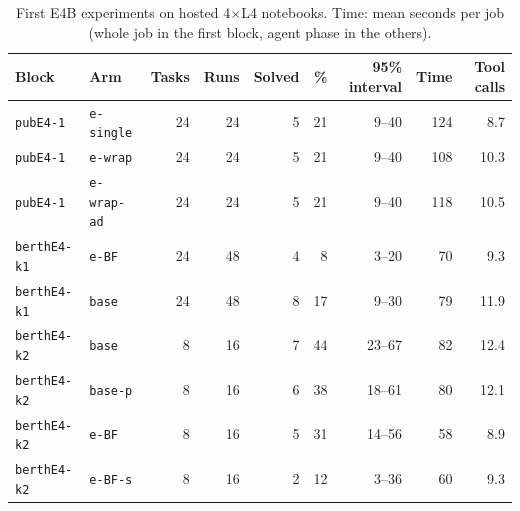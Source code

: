 \begin{table}[t]
\centering
\footnotesize
\caption{First E4B experiments on hosted 4$\times$L4 notebooks. Time: mean seconds per job (whole job in the first block, agent phase in the others).}
\label{tab:smallfirst}
\begin{tabular}{llrrrrrrr}
\toprule
Block & Arm & Tasks & Runs & Solved & \% & 95\% interval & Time & Tool calls \\
\midrule
\texttt{pubE4-1} & \texttt{e-single} & 24 & 24 & 5 & 21 & 9--40 & 124 & 8.7 \\
\texttt{pubE4-1} & \texttt{e-wrap} & 24 & 24 & 5 & 21 & 9--40 & 108 & 10.3 \\
\texttt{pubE4-1} & \texttt{e-wrap-ad} & 24 & 24 & 5 & 21 & 9--40 & 118 & 10.5 \\
\addlinespace
\texttt{berthE4-k1} & \texttt{e-BF} & 24 & 48 & 4 & 8 & 3--20 & 70 & 9.3 \\
\texttt{berthE4-k1} & \texttt{base} & 24 & 48 & 8 & 17 & 9--30 & 79 & 11.9 \\
\addlinespace
\texttt{berthE4-k2} & \texttt{base} & 8 & 16 & 7 & 44 & 23--67 & 82 & 12.4 \\
\texttt{berthE4-k2} & \texttt{base-p} & 8 & 16 & 6 & 38 & 18--61 & 80 & 12.1 \\
\texttt{berthE4-k2} & \texttt{e-BF} & 8 & 16 & 5 & 31 & 14--56 & 58 & 8.9 \\
\texttt{berthE4-k2} & \texttt{e-BF-s} & 8 & 16 & 2 & 12 & 3--36 & 60 & 9.3 \\
\bottomrule
\end{tabular}
\end{table}
